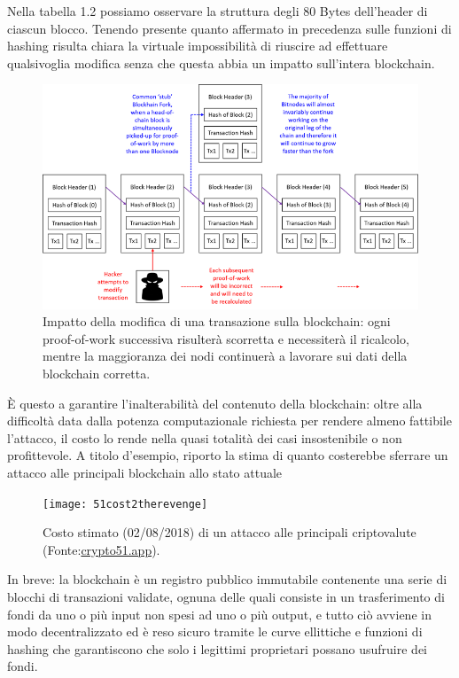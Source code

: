 Nella tabella 1.2 possiamo osservare la struttura degli 80 Bytes dell’header di ciascun blocco. Tenendo presente quanto affermato in precedenza sulle funzioni di hashing risulta chiara la virtuale impossibilità di riuscire ad effettuare qualsivoglia modifica senza che questa abbia un impatto sull’intera blockchain.

\begin{figure}
	\centering
	\includegraphics[width=1.0\linewidth]{images/blockchain-diagram}
	\caption{Impatto della modifica di una transazione sulla blockchain: ogni proof-of-work successiva risulterà scorretta e necessiterà il ricalcolo, mentre la maggioranza dei nodi continuerà a lavorare sui dati della blockchain corretta.}
	\label{fig:blockchain-diagram}
\end{figure}


È questo a garantire l’inalterabilità del contenuto della blockchain: oltre alla difficoltà data dalla potenza computazionale richiesta per rendere almeno fattibile l’attacco, il costo lo rende nella quasi totalità dei casi insostenibile o non profittevole.
A titolo d’esempio, riporto la stima di quanto costerebbe sferrare un attacco alle principali blockchain allo stato attuale

\begin{figure}[h]
\centering
\texttt{[image: 51cost2therevenge]}	
\caption{Costo stimato (02/08/2018) di un attacco alle principali criptovalute (Fonte:\url{crypto51.app}).}
\label{fig:51cost2therevenge}
\end{figure}



In breve: la blockchain è un registro pubblico immutabile contenente una serie di blocchi di transazioni validate, ognuna delle quali consiste in un trasferimento di fondi da uno o più input non spesi ad uno o più output, e tutto ciò avviene in modo decentralizzato ed è reso sicuro tramite le curve ellittiche e funzioni di hashing che garantiscono che solo i legittimi proprietari possano usufruire dei fondi.



